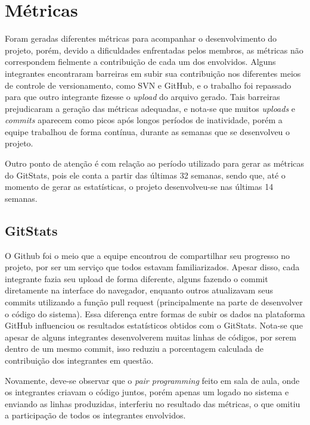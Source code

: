 \documentclass[
    12pt,               %
    openright,          %
    oneside,
    a4paper,            %
    BIBLATEX,           %
    TODO,               %
    english,            %
    brazil              %
    ]{ifsp-spo-inf-ctds}
\begin{document}
\section{Métricas}

    Foram geradas diferentes métricas para acompanhar o desenvolvimento do projeto, porém, devido a dificuldades enfrentadas pelos membros, as métricas não correspondem fielmente a contribuição de cada um dos envolvidos. Alguns integrantes encontraram barreiras em subir sua contribuição nos diferentes meios de controle de versionamento, como SVN e GitHub, e o trabalho foi repassado para que outro integrante fizesse o \emph{upload} do arquivo gerado.
    Tais barreiras prejudicaram a geração das métricas adequadas, e nota-se que muitos \emph{uploads} e \emph{commits} aparecem como picos após longos períodos de inatividade, porém a equipe trabalhou de forma contínua, durante as semanas que se desenvolveu o projeto. 

    Outro ponto de atenção é com relação ao período utilizado para gerar as métricas do GitStats, pois ele conta a partir das últimas 32 semanas, sendo que, até o momento de gerar as estatísticas, o projeto desenvolveu-se nas últimas 14 semanas.

    \subsection{GitStats}

    O Github foi o meio que a equipe encontrou de compartilhar seu progresso no projeto, por ser um serviço que todos estavam familiarizados. Apesar disso, cada integrante fazia seu upload de forma diferente, alguns fazendo o commit diretamente na interface do navegador, enquanto outros atualizavam seus commits utilizando a função pull request (principalmente na parte de desenvolver o código do sistema). Essa diferença entre formas de subir os dados na plataforma GitHub influenciou os resultados estatísticos obtidos com o GitStats. Nota-se que apesar de alguns integrantes desenvolverem muitas linhas de códigos, por serem dentro de um mesmo commit, isso reduziu a porcentagem calculada de contribuição dos integrantes em questão. 

    Novamente, deve-se observar que o \emph{pair programming} feito em sala de aula, onde os integrantes criavam o código juntos, porém apenas um logado no sistema e enviando as linhas produzidas, interferiu no resultado das métricas, o que omitiu a participação de todos os integrantes envolvidos.
\end{document}
